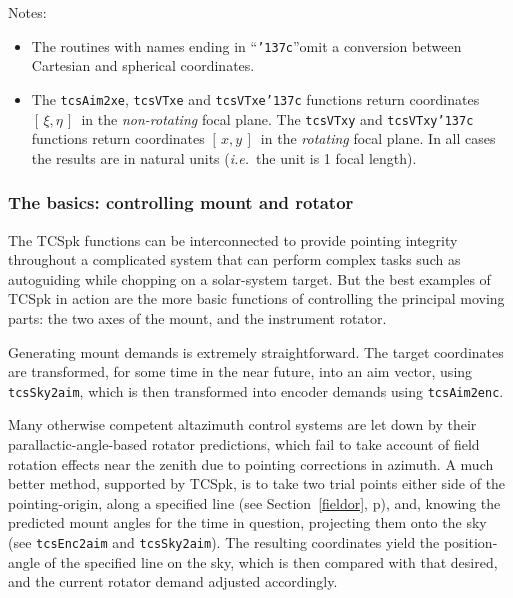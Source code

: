 \documentclass[12pt,fleqn,twoside]{article}
\renewcommand{\_}{{\tt\char'137}}     %
\newcommand{\xieta}     {$[\,\xi,\eta\,]$}
\newcommand{\xy}        {$[\,x,y\,]$}
\begin{document}
Notes:
\begin{itemize}

\item The routines with names ending in ``{\tt \_c}''omit a
      conversion between Cartesian and spherical coordinates.

\item The {\tt tcsAim2xe}, {\tt tcsVTxe} and {\tt tcsVTxe\_c}
      functions return coordinates \xieta\ in the
      {\it non-rotating}\/ focal plane.  The {\tt tcsVTxy} and
      {\tt tcsVTxy\_c} functions return coordinates \xy\
      in the {\it rotating}\/ focal plane.  In all
      cases the results are in natural units
      ({\it i.e.}~the unit is 1 focal length).

\end{itemize}
\fi

\subsubsection{The basics: controlling mount and rotator}

The TCSpk functions can be interconnected to provide
pointing integrity throughout a complicated system that can
perform complex tasks such as autoguiding while chopping on a
solar-system target. But the best examples of TCSpk in
action are the more basic functions of controlling the principal
moving parts: the two axes of the mount, and the instrument
rotator.

Generating mount demands is extremely straightforward.  The
target coordinates are transformed, for some time in the near
future, into an aim vector, using {\tt tcsSky2aim}, which is then
transformed into encoder demands using {\tt tcsAim2enc}.

Many otherwise competent altazimuth control systems are let down
by their parallactic-angle-based rotator predictions, which fail
to take account of field rotation effects near the zenith due to
pointing corrections in azimuth.  A much better method, supported
by TCSpk, is to take two trial points either side of the
pointing-origin, along a specified line
\ifx\vdoc\vfull
(see Section~\ref{fieldor},
p\pageref{fieldor}),
\fi
and, knowing the
predicted mount angles for the time in question, projecting them
onto the sky (see {\tt tcsEnc2aim} and {\tt tcsSky2aim}). The resulting
coordinates yield the position-angle of the specified line on the
sky, which is then compared with that desired, and the current
rotator demand adjusted accordingly.
\end{document}
